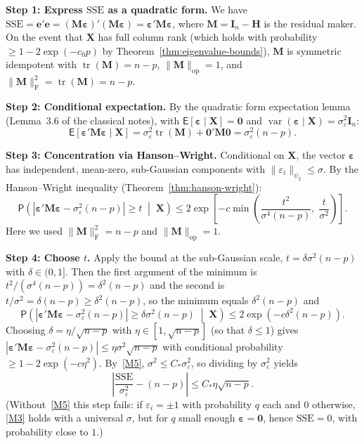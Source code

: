 \documentclass[12pt,a4paper]{article}
\makeatletter
\theoremstyle{definition}
\renewenvironment{proof}[1][\proofname]{\par
  \pushQED{\qed}%
  \normalfont \topsep6\p@\@plus6\p@\relax
  \trivlist
  \item[\hskip\labelsep\bfseries #1\@addpunct{.}]\ignorespaces
}{%
  \popQED\endtrivlist\@endpefalse
}
\newcommand\expc{\mathsf{E}}
\newcommand\prb{\mathsf{P}}
\DeclareMathOperator\var{var}
\DeclareMathOperator\tr{tr}
\newcommand{\SSE}{\mathrm{SSE}}
\newcommand{\bX}{\mathbf{X}}
\newcommand{\be}{\boldsymbol{\varepsilon}}
\newcommand{\bI}{\mathbf{I}}
\newcommand{\bH}{\mathbf{H}}
\newcommand{\bM}{\mathbf{M}}
\newcommand{\bzero}{\mathbf{0}}
\newcommand{\opnorm}[1]{\|#1\|_{\mathrm{op}}}
\newcommand{\fnorm}[1]{\|#1\|_{\mathrm{F}}}
\makeatother
\begin{document}
\begin{proof}
\textbf{Step 1: Express $\SSE$ as a quadratic form.} We have $\SSE = \mathbf{e}'\mathbf{e} = (\bM\be)'(\bM\be) = \be'\bM\be$, where $\bM = \bI_n - \bH$ is the residual maker. On the event that $\bX$ has full column rank (which holds with probability $\geqslant 1 - 2\exp(-c_0 p)$ by Theorem~\ref{thm:eigenvalue-bounds}), $\bM$ is symmetric idempotent with $\tr(\bM) = n - p$, $\opnorm{\bM} = 1$, and $\fnorm{\bM}^2 = \tr(\bM) = n - p$.

\textbf{Step 2: Conditional expectation.} By the quadratic form expectation lemma (Lemma~3.6 of the classical notes), with $\expc[\be \mid \bX] = \bzero$ and $\var(\be \mid \bX) = \sigma_\varepsilon^2\bI_n$:
\[
\expc[\be'\bM\be \mid \bX] = \sigma_\varepsilon^2\tr(\bM) + \bzero'\bM\bzero = \sigma_\varepsilon^2(n-p).
\]

\textbf{Step 3: Concentration via Hanson--Wright.} Conditional on $\bX$, the vector $\be$ has independent, mean-zero, sub-Gaussian components with $\|\varepsilon_i\|_{\psi_2} \leqslant \sigma$. By the Hanson--Wright inequality (Theorem~\ref{thm:hanson-wright}):
\[
\prb\!\left(|\be'\bM\be - \sigma_\varepsilon^2(n-p)| \geqslant t \;\middle|\; \bX\right) \leqslant 2\exp\!\left[-c\min\!\left(\frac{t^2}{\sigma^4(n-p)},\; \frac{t}{\sigma^2}\right)\right].
\]
Here we used $\fnorm{\bM}^2 = n - p$ and $\opnorm{\bM} = 1$.

\textbf{Step 4: Choose $t$.} Apply the bound at the sub-Gaussian scale, $t = \delta\sigma^2(n-p)$ with $\delta \in (0,1]$. Then the first argument of the minimum is $t^2/(\sigma^4(n-p)) = \delta^2(n-p)$ and the second is $t/\sigma^2 = \delta(n-p) \geqslant \delta^2(n-p)$, so the minimum equals $\delta^2(n-p)$ and
\[
\prb\!\left(|\be'\bM\be - \sigma_\varepsilon^2(n-p)| \geqslant \delta\sigma^2(n-p) \;\middle|\; \bX\right) \leqslant 2\exp(-c\delta^2(n-p)).
\]
Choosing $\delta = \eta/\sqrt{n-p}$ with $\eta \in [1, \sqrt{n-p}]$ (so that $\delta \leqslant 1$) gives $|\be'\bM\be - \sigma_\varepsilon^2(n-p)| \leqslant \eta\sigma^2\sqrt{n-p}$ with conditional probability $\geqslant 1 - 2\exp(-c\eta^2)$. By~\ref{M5}, $\sigma^2 \leqslant C_*\sigma_\varepsilon^2$, so dividing by $\sigma_\varepsilon^2$ yields
\[
\left|\frac{\SSE}{\sigma_\varepsilon^2} - (n-p)\right| \leqslant C_*\eta\sqrt{n-p}.
\]
(Without~\ref{M5} this step fails: if $\varepsilon_i = \pm 1$ with probability $q$ each and $0$ otherwise, \ref{M3} holds with a universal $\sigma$, but for $q$ small enough $\be = \bzero$, hence $\SSE = 0$, with probability close to $1$.)


\end{proof}
\end{document}
